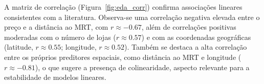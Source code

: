 \begin{table}[h!]

    \centering

    \caption{Sumário descritivo das variáveis preditoras.}

    \label{tab:eda_describe}


\end{table}



A matriz de correlação (Figura~\ref{fig:eda_corr}) confirma associações lineares consistentes com a literatura. Observa-se uma correlação negativa elevada entre o preço e a distância ao MRT, com $r \approx -0.67$, além de correlações positivas moderadas com o número de lojas ($r \approx 0.57$) e com as coordenadas geográficas (latitude, $r \approx 0.55$; longitude, $r \approx 0.52$). Também se destaca a alta correlação entre os próprios preditores espaciais, como distância ao MRT e longitude ($r \approx -0.81$), o que sugere a presença de colinearidade, aspecto relevante para a estabilidade de modelos lineares.



